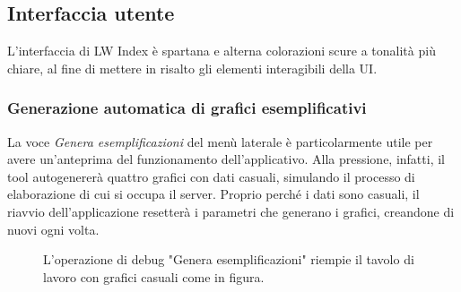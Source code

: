 \newpage

\subsection{Interfaccia utente}

L'interfaccia di LW Index è spartana e alterna colorazioni scure a tonalità più chiare, al fine di mettere in risalto gli elementi interagibili della UI.

\subsubsection{Generazione automatica di grafici esemplificativi}

La voce \textit{Genera esemplificazioni} del menù laterale è particolarmente utile per avere un'anteprima del funzionamento dell'applicativo. Alla pressione, infatti, il tool autogenererà quattro grafici con dati casuali, simulando il processo di elaborazione di cui si occupa il server. Proprio perché i dati sono casuali, il riavvio dell'applicazione resetterà i parametri che generano i grafici, creandone di nuovi ogni volta.

\begin{figure}[ht!]
    \centering
    \caption{L'operazione di debug "Genera esemplificazioni" riempie il tavolo di lavoro con grafici casuali come in figura.}
    \label{fig:esempio}
\end{figure}

